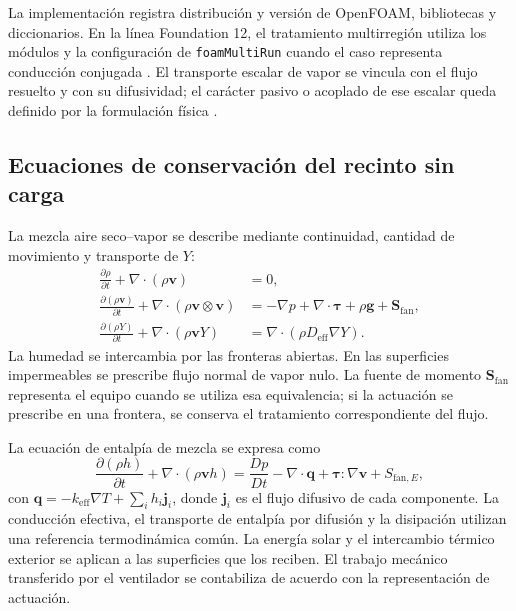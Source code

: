 La implementación registra distribución y versión de OpenFOAM, bibliotecas y diccionarios. En la línea Foundation 12, el tratamiento multirregión utiliza los módulos y la configuración de \texttt{foamMultiRun} cuando el caso representa conducción conjugada \cite{openfoam12_multirun}. El transporte escalar de vapor se vincula con el flujo resuelto y con su difusividad; el carácter pasivo o acoplado de ese escalar queda definido por la formulación física \cite{openfoam12_scalar}.

\subsection{Ecuaciones de conservación del recinto sin carga}

La mezcla aire seco--vapor se describe mediante continuidad, cantidad de movimiento y transporte de $Y$:
\begin{align}
\frac{\partial\rho}{\partial t}+\nabla\cdot(\rho\mathbf v)&=0,
\label{met:cfd_continuidad}\\
\frac{\partial(\rho\mathbf v)}{\partial t}
+\nabla\cdot(\rho\mathbf v\otimes\mathbf v)
&=-\nabla p+\nabla\cdot\boldsymbol\tau+\rho\mathbf g+\mathbf S_{\mathrm{fan}},
\label{met:cfd_momento}\\
\frac{\partial(\rho Y)}{\partial t}+\nabla\cdot(\rho\mathbf vY)
&=\nabla\cdot(\rho D_{\mathrm{eff}}\nabla Y).
\label{met:cfd_vapor}
\end{align}
La humedad se intercambia por las fronteras abiertas. En las superficies impermeables se prescribe flujo normal de vapor nulo. La fuente de momento $\mathbf S_{\mathrm{fan}}$ representa el equipo cuando se utiliza esa equivalencia; si la actuación se prescribe en una frontera, se conserva el tratamiento correspondiente del flujo.

La ecuación de entalpía de mezcla se expresa como
\begin{equation}
\frac{\partial(\rho h)}{\partial t}+\nabla\cdot(\rho\mathbf vh)
=\frac{Dp}{Dt}-\nabla\cdot\mathbf q
+\boldsymbol\tau:\nabla\mathbf v+S_{\mathrm{fan},E},
\label{met:cfd_energia}
\end{equation}
con $\mathbf q=-k_{\mathrm{eff}}\nabla T+\sum_i h_i\mathbf j_i$, donde $\mathbf j_i$ es el flujo difusivo de cada componente. La conducción efectiva, el transporte de entalpía por difusión y la disipación utilizan una referencia termodinámica común. La energía solar y el intercambio térmico exterior se aplican a las superficies que los reciben. El trabajo mecánico transferido por el ventilador se contabiliza de acuerdo con la representación de actuación.

